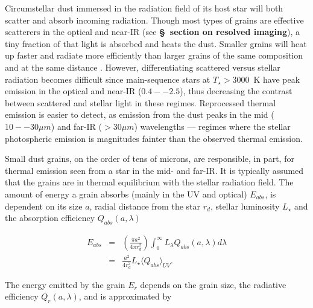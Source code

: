     Circumstellar dust immersed in the radiation field of its host star will both scatter and absorb incoming radiation. Though most types of grains are effective scatterers in the optical and near-IR (see \textbf{\S~section on resolved imaging}), a tiny fraction of that light is absorbed and heats the dust. Smaller grains will heat up faster and radiate more efficiently than larger grains of the same composition and at the same distance \citep{Krivov2010}. However, differentiating scattered versus stellar radiation becomes difficult since main-sequence stars at $T_\star>3000$~K have peak emission in the optical and near-IR ($0.4--2.5$\micron), thus decreasing the contrast between scattered and stellar light in these regimes. Reprocessed thermal emission is easier to detect, as emission from the dust peaks in the mid ($10--30\mu m$) and far-IR ($>30\mu m$) wavelengths --- regimes where the stellar photospheric emission is magnitudes fainter than the observed thermal emission.  
        

    Small dust grains, on the order of tens of microns, are responsible, in part, for thermal emission seen from a star in the mid- and far-IR. It is typically assumed that the grains are in thermal equilibrium with the stellar radiation field. The amount of energy a grain absorbs (mainly in the UV and optical) $E_{abs}$, is dependent on its size $a$, radial distance from the star $r_d$, stellar luminosity $L_\star$ and the absorption efficiency $Q_{abs}(a,\lambda)$
    
    \begin{eqnarray}\label{eq:energy_absorbed}
    E_{abs} &=& \left(\frac{\pi a^2}{4\pi r_d^2}\right) \int_0^\infty L_{\lambda} Q_{abs}(a,\lambda) d\lambda \\
            &=&  \frac{a^2}{4r_d^2}L_\star \langle Q_{abs}\rangle_{UV}. 
    \end{eqnarray}
    
    \noindent The energy emitted by the grain $E_{r}$ depends on the grain size, the radiative efficiency $Q_{r}(a,\lambda)$, and is approximated by
    
